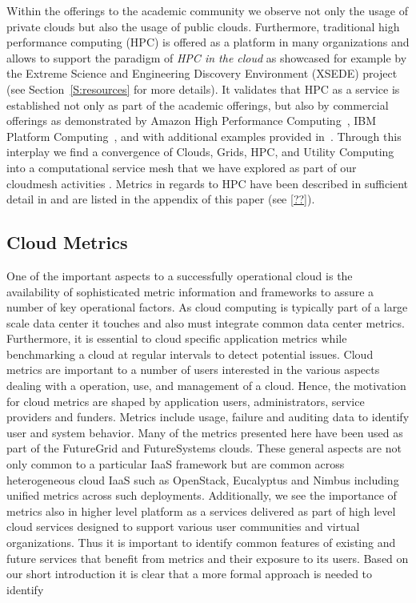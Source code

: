 \documentclass{sig-alternate-05-2015}
\begin{document}
Within the offerings to the academic community we observe not only the usage of private clouds but also the usage of public clouds. Furthermore, traditional high performance computing (HPC) is offered as a platform in many organizations and allows to support the paradigm of {\it HPC in the cloud} as showcased for example by the Extreme Science and Engineering Discovery Environment (XSEDE) project (see Section~\ref {S:resources} for more details).  It validates that HPC as a service is established not only as part of the academic offerings, but also by commercial offerings as demonstrated by Amazon High Performance Computing~\cite{awshpc}, IBM Platform Computing~\cite{ibmhpc}, and with additional examples provided in~\cite{DouglasEadline}. 
Through this interplay we find a convergence of Clouds, Grids, HPC, and Utility Computing into a computational service mesh that we have explored as part of our cloudmesh activities \cite{las14cloudmeshmultiple, las12fg-bookchapter}. Metrics in regards to HPC have been described in sufficient detail in \cite{las13xdmod} and are listed in the appendix of this paper (see \ref{??}).


\subsection{Cloud Metrics}

One of the important aspects to a successfully operational cloud is the availability of sophisticated metric information and frameworks to assure a number of key operational factors. As cloud computing is typically part of a large scale data center it touches and also must integrate common data center metrics. Furthermore, it is essential to cloud specific application metrics while benchmarking a cloud at regular intervals to detect potential issues. Cloud metrics are important to a number of users interested in the various aspects dealing with a operation, use, and management of a cloud. Hence, the motivation for cloud metrics are shaped by application users, administrators, service providers and funders. Metrics include usage, failure and auditing data to identify user and system behavior. Many of the metrics presented here have been used as part of the FutureGrid and FutureSystems clouds. These general aspects are not only common to a particular IaaS framework but are common across heterogeneous cloud IaaS such as OpenStack, Eucalyptus and Nimbus including unified metrics across such deployments.  Additionally, we see the importance of metrics also in higher level platform as a services delivered as part of high level cloud services designed to support various user communities and virtual organizations. Thus it is important to identify common features of existing and future services that benefit from metrics and their exposure to its users. Based on our short introduction it is clear that a more formal approach is needed to identify
\end{document}
